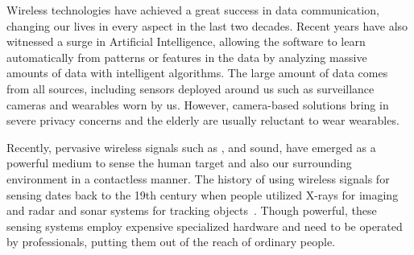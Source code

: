 Wireless technologies have achieved a great success in data communication, changing our lives in every aspect in the last two decades. 
Recent years have also witnessed a surge in Artificial Intelligence, allowing the software to learn automatically from patterns or features in the data by analyzing massive amounts of data with intelligent algorithms. %
The large amount of data comes from all sources, including sensors deployed around us such as surveillance cameras and wearables worn by us. However, camera-based solutions bring in severe privacy concerns and the elderly are usually reluctant to wear wearables.   


Recently, pervasive wireless signals such as \WiFi, \RFID and sound, have emerged as a powerful medium to sense the human target and also our surrounding environment in a contactless manner. 
The history of using wireless signals for sensing dates back to the 19th century when people utilized X-rays for imaging~\cite{Suzuki1996} and radar and sonar systems for tracking objects~\cite{Au1988Sonar}. Though powerful, these sensing systems employ expensive specialized hardware and need to be operated by professionals, putting them out of the reach of ordinary people.

